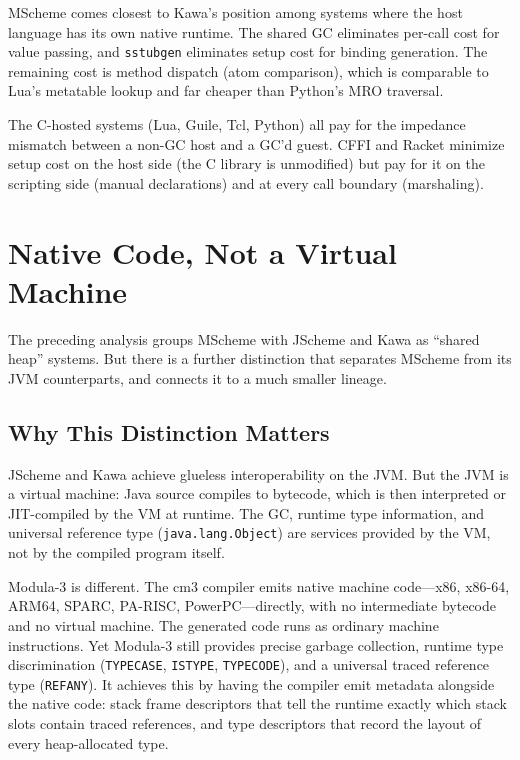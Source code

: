 \documentclass[11pt]{article}
\begin{document}
MScheme comes closest to Kawa's position among systems where the host
language has its own native runtime.  The shared GC eliminates
per-call cost for value passing, and \texttt{sstubgen} eliminates
setup cost for binding generation.  The remaining cost is method
dispatch (atom comparison), which is comparable to Lua's metatable
lookup and far cheaper than Python's MRO traversal.

The C-hosted systems (Lua, Guile, Tcl, Python) all pay for the
impedance mismatch between a non-GC host and a GC'd guest.  CFFI and
Racket minimize setup cost on the host side (the C library is
unmodified) but pay for it on the scripting side (manual declarations)
and at every call boundary (marshaling).


\section{Native Code, Not a Virtual Machine}
\label{sec:native-code}

The preceding analysis groups MScheme with JScheme and Kawa as
``shared heap'' systems.  But there is a further distinction that
separates MScheme from its JVM counterparts, and connects it to a much
smaller lineage.


\subsection{Why This Distinction Matters}
\label{sec:why-native}

JScheme and Kawa achieve glueless interoperability on the JVM.  But
the JVM is a virtual machine: Java source compiles to bytecode, which
is then interpreted or JIT-compiled by the VM at runtime.  The GC,
runtime type information, and universal reference type
(\texttt{java.lang.Object}) are services provided by the VM, not by
the compiled program itself.

Modula-3 is different.  The cm3 compiler emits native machine code---x86,
x86-64, ARM64, SPARC, PA-RISC, PowerPC---directly, with no
intermediate bytecode and no virtual machine.  The generated code runs
as ordinary machine instructions.  Yet Modula-3 still provides precise
garbage collection, runtime type discrimination (\texttt{TYPECASE},
\texttt{ISTYPE}, \texttt{TYPECODE}), and a universal traced reference
type (\texttt{REFANY}).  It achieves this by having the compiler emit
metadata alongside the native code: stack frame descriptors that tell
the runtime exactly which stack slots contain traced references, and
type descriptors that record the layout of every heap-allocated type.
\end{document}
